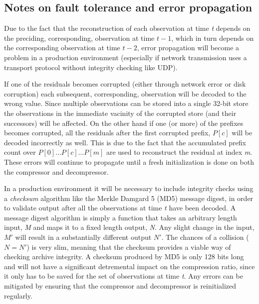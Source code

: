   \subsection{Notes on fault tolerance and error propagation}
    Due to the fact that the reconstruction of each observation at time \textit{t} depends on the preciding, corresponding, observation at time $t-1$, which in turn 
    depends on the corresponding observation at time $t-2$, error propagation will become a problem in a production environment (especially if network transmission uses a transport
    protocol without integrity checking like UDP). 
  
    If one of the residuals becomes corrupted (either through network error or disk corruption) each subsequent, corresponding, 
    observation will be decoded to the wrong value. Since multiple observations can be stored into a single 32-bit store the observations in the immediate vacinity of the corrupted
    store (and their successors) will be affected. On the other hand if one (or more) of the prefixes becomes corrupted, all the residuals after the first corrupted prefix, $P[c]$ will be decoded 
    incorrectly as well. This is due to the fact that the accumulated prefix count over $P[0]\dots P[c]\dots P[m]$ are used to reconstruct the residual at index \textit{m}. These 
    errors will continue to propagate until a fresh initialization is done on both the compressor and decompressor. 
    
    In a production environment it will be necessary to include integrity checks using a \textit{checksum} algorithm like the Merkle Damgard 5 (MD5) message digest, in order to validate output after all the observations
    at time \textit{t} have been decoded. A message digest algorithm is simply a function that takes an arbitrary length input, \textit{M} and maps it to a fixed length output, 
    \textit{N}. Any slight change in the input, $M'$ will result in a substantially different output $N'$. The chances of a collision ($N = N'$) is very slim, meaning that 
    the checksum provides a viable way of checking archive integrity. A checksum produced by MD5 is only 128 bits long and will not have a significant detremental impact on the
    compression ratio, since it only has to be saved for the set of observations at time \textit{t}. Any errors can be mitigated by ensuring that the compressor and decompressor
    is reinitialized regularly.
